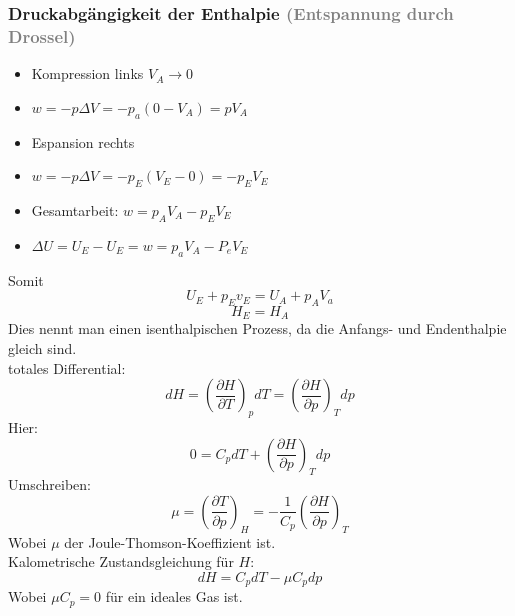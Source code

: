 \documentclass[a4paper, fleqn]{article}
\begin{document}
\subsubsection{Druckabgängigkeit der Enthalpie \textcolor{gray}{(Entspannung durch Drossel)}}
\begin{itemize}
    \item[] Kompression links $V_A \rightarrow 0$
    \item[] $w = -p\Delta V=-p_a(0-V_A)=pV_A$
    \item[] Espansion rechts
    \item[] $w = -p\Delta V = -p_E(V_E - 0) = -p_EV_E$
    \item[] Gesamtarbeit: $w = p_AV_A-p_EV_E$
    \item[] $\Delta U=U_E-U_E=w=p_aV_A - P_eV_E$
\end{itemize}
Somit
\begin{equation*}
    U_E + p_Ev_E = U_A + p_AV_a
\end{equation*}
\begin{equation*}
    H_E = H_A
\end{equation*}
Dies nennt man einen isenthalpischen Prozess, da die Anfangs- und Endenthalpie gleich sind.\\
totales Differential:
\begin{equation*}
    dH = \left(\frac{\partial H}{\partial T}\right)_p dT = \left(\frac{\partial H}{\partial p}\right)_T dp
\end{equation*}
Hier:
\begin{equation*}
    0 = C_p dT + \left(\frac{\partial H}{\partial p}\right)_T dp
\end{equation*}
Umschreiben:
\begin{equation*}
    \mu = \left(\frac{\partial T}{\partial p}\right)_H = - \frac{1}{C_p}\left(\frac{\partial H}{\partial p}\right)_T
\end{equation*}
Wobei $\mu$ der Joule-Thomson-Koeffizient ist.\\
Kalometrische Zustandsgleichung für $H$:
\begin{equation*}
    dH = C_p dT - \mu C_p dp
\end{equation*}
Wobei $\mu C_p = 0$ für ein ideales Gas ist.
\end{document}
